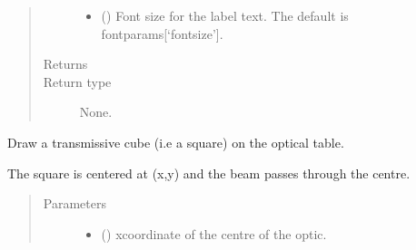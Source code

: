 \documentclass[letterpaper,10pt,english]{sphinxmanual}
\begin{document}
\begin{fulllineitems}
\begin{fulllineitems}
\begin{quote}
\begin{description}
\begin{itemize}
\item {} 
\sphinxAtStartPar
{} (\sphinxstyleliteralemphasis{\sphinxupquote{, }}) \textendash{} Font size for the label text. The default is fontparams{[}‘fontsize’{]}.

\end{itemize}

\item[{Returns}] \leavevmode
\sphinxAtStartPar


\item[{Return type}] \leavevmode
\sphinxAtStartPar
None.

\end{description}\end{quote}

\end{fulllineitems}


\begin{fulllineitems}
\label{\detokenize{index:pyopticaltable.OpticalTable.transmissive_cube}}
\sphinxAtStartPar
Draw a transmissive cube (i.e a square) on the optical table.

\sphinxAtStartPar
The square is centered at (x,y) and the beam passes through the centre.
\begin{quote}\begin{description}
\item[{Parameters}] \leavevmode\begin{itemize}
\item {} 
\sphinxAtStartPar
{} () \textendash{} x\sphinxhyphen{}coordinate of the centre of the optic.


\end{itemize}
\end{description}
\end{quote}
\end{fulllineitems}
\end{fulllineitems}
\end{document}
